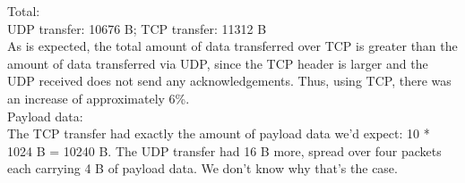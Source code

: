 Total: \\
UDP transfer: 10676 B; TCP transfer: 11312 B \\
As is expected, the total amount of data transferred over TCP is greater than the amount of data transferred via UDP, since the TCP header is larger and the UDP received does not send any acknowledgements. Thus, using TCP, there was an increase of approximately 6\%. \\
Payload data: \\
The TCP transfer had exactly the amount of payload data we'd expect: 10 * 1024 B = 10240 B. The UDP transfer had 16 B more, spread over four packets each carrying 4 B of payload data. We don't know why that's the case.